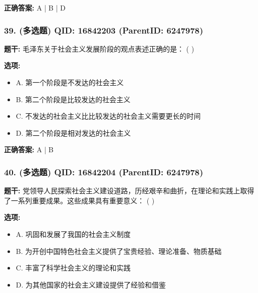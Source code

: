 \documentclass[12pt,UTF8]{ctexart}
\begin{document}
\textbf{正确答案:}
A | B | D

\vspace{0.3em}\hrulefill\vspace{0.7em}

\subsubsection*{39. (多选题) \small QID: 16842203 (ParentID: 6247978)}

\textbf{题干:}
毛泽东关于社会主义发展阶段的观点表述正确的是： ( )



\textbf{选项:}
\begin{itemize}[leftmargin=*]

  \item A. 第一个阶段是不发达的社会主义

  \item B. 第二个阶段是比较发达的社会主义

  \item C. 不发达的社会主义比比较发达的社会主义需要更长的时间

  \item D. 第二个阶段是相对发达的社会主义

\end{itemize}

\textbf{正确答案:}
A | B

\vspace{0.3em}\hrulefill\vspace{0.7em}

\subsubsection*{40. (多选题) \small QID: 16842204 (ParentID: 6247978)}

\textbf{题干:}
党领导人民探索社会主义建设道路，历经艰辛和曲折，在理论和实践上取得了一系列重要成果。这些成果具有重要意义： ( )



\textbf{选项:}
\begin{itemize}[leftmargin=*]

  \item A. 巩固和发展了我国的社会主义制度

  \item B. 为开创中国特色社会主义提供了宝贵经验、理论准备、物质基础

  \item C. 丰富了科学社会主义的理论和实践

  \item D. 为其他国家的社会主义建设提供了经验和借鉴

\end{itemize}
\end{document}
